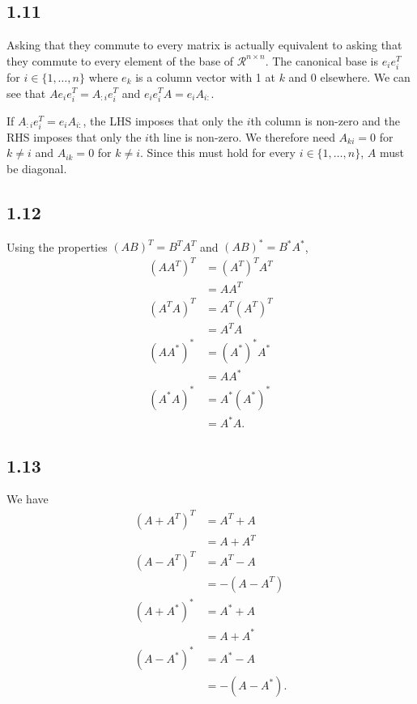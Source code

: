 \subsection*{1.11}
\begin{solution}
  Asking that they commute to every matrix is actually equivalent to asking
  that they commute to every element of the base of $\mathcal{R}^{n \times n}$.
  The canonical base is $e_ie_i^T$ for $i \in \{1, \ldots, n\}$ where
  $e_k$ is a column vector with 1 at $k$ and 0 elsewhere.
  We can see that $Ae_ie_i^T = A_{:i}e_i^T$ and $e_ie_i^TA = e_iA_{i:}$.

  If $A_{:i}e_i^T = e_iA_{i:}$, the LHS imposes that only the $i$th column is non-zero
  and the RHS imposes that only the $i$th line is non-zero.
  We therefore need $A_{ki} = 0$ for $k \neq i$ and $A_{ik} = 0$ for $k \neq i$.
  Since this must hold for every $i \in \{1, \ldots, n\}$, $A$ must be diagonal.
\end{solution}

\subsection*{1.12}
\begin{solution}
  Using the properties $(AB)^T = B^TA^T$ and $(AB)^* = B^*A^*$,
  \begin{align*}
    (AA^T)^T & = (A^T)^TA^T\\
             & = AA^T\\
    (A^TA)^T & = A^T(A^T)^T\\
             & = A^TA\\
    (AA^*)^* & = (A^*)^*A^*\\
             & = AA^*\\
    (A^*A)^* & = A^*(A^*)^*\\
             & = A^*A.
  \end{align*}
\end{solution}

\subsection*{1.13}
\begin{solution}
  We have
  \begin{align*}
    (A + A^T)^T & = A^T + A\\
                & = A + A^T\\
    (A - A^T)^T & = A^T - A\\
                & = -(A - A^T)\\
    (A + A^*)^* & = A^* + A\\
                & = A + A^*\\
    (A - A^*)^* & = A^* - A\\
                & = -(A - A^*).
  \end{align*}
\end{solution}

